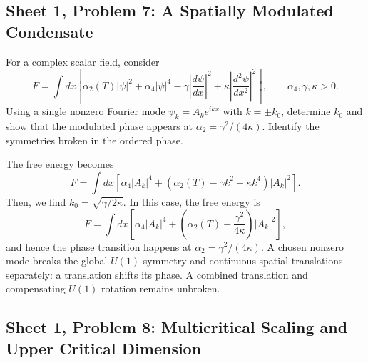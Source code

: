 \subsection{Sheet 1, Problem 7: A Spatially Modulated Condensate}

For a complex scalar field, consider
\begin{equation}
    F=\int dx\left[
    \alpha_2(T)|\psi|^2+\alpha_4|\psi|^4
    -\gamma\left|\frac{d\psi}{dx}\right|^2
    +\kappa\left|\frac{d^2\psi}{dx^2}\right|^2\right],
    \qquad \alpha_4,\gamma,\kappa>0.
\end{equation}
Using a single nonzero Fourier mode
$\psi_k=A_ke^{ikx}$ with $k=\pm k_0$, determine $k_0$ and show
that the modulated phase appears at $\alpha_2=\gamma^2/(4\kappa)$.
Identify the symmetries broken in the ordered phase.
\begin{solution}
    The free energy becomes
    \begin{equation}
        F = \int dx\left[\alpha_4|A_k|^4 + (\alpha_2(T) - \gamma k^2 + \kappa k^4)|A_k|^2\right].
    \end{equation}
    Then, we find $k_0 = \sqrt{\gamma/{2\kappa}}$. In this case, the free energy is
    \begin{equation}
        F = \int dx\left[\alpha_4|A_k|^4 + \left(\alpha_2(T) - \frac{\gamma^2}{4\kappa}\right)|A_k|^2\right],
    \end{equation}
    and hence the phase transition happens at $\alpha_2 = \gamma^2/(4\kappa)$. A chosen nonzero mode breaks the global $U(1)$ symmetry and continuous spatial translations separately: a translation shifts its phase. A combined translation and compensating $U(1)$ rotation remains unbroken.
\end{solution}

\subsection{Sheet 1, Problem 8: Multicritical Scaling and Upper Critical Dimension}

